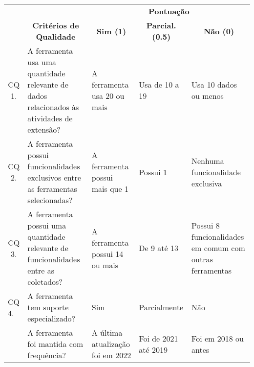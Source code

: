 \begin{table}[!htb]
  \centering
  \tiny
  \begin{tabular}{c|p{3.5cm}|p{1.5cm}|p{1.5cm}|p{2cm}}
    \bottomrule
    \rowcolor[rgb]{0.753,0.753,0.753} {\cellcolor[rgb]{0.753,0.753,0.753}}                              & \multicolumn{1}{c|}{{\cellcolor[rgb]{0.753,0.753,0.753}}}                                            & \multicolumn{3}{c}{\textbf{\textbf{Pontuação}}}                                                                                       \\
    \hhline{>{\arrayrulecolor[rgb]{0.753,0.753,0.753}}-->{\arrayrulecolor{black}}---}
    \rowcolor[rgb]{0.753,0.753,0.753} \multirow{-2}{*}{{\cellcolor[rgb]{0.753,0.753,0.753}}\textbf{ID}} & \multicolumn{1}{c|}{\multirow{-2}{*}{{\cellcolor[rgb]{0.753,0.753,0.753}}\textbf{Critérios de Qualidade}}} & \multicolumn{1}{c|}{\textbf{Sim (1)}}       & \multicolumn{1}{c|}{\textbf{Parcial. (0.5)}} & \multicolumn{1}{c}{\textbf{Não (0)}}   \\
    \hline
    \rowcolor[rgb]{0.898,0.898,0.898} CQ 1.                                                             & A ferramenta usa uma quantidade relevante de dados relacionados às atividades de extensão?                          & A ferramenta usa 20 ou mais                           & Usa de 10 a 19                                     & Usa 10 dados ou menos              \\
    CQ 2.                                                                                               & A ferramenta possui funcionalidades exclusivos entre as ferramentas selecionadas?                                         & A ferramenta possui mais que 1                              & Possui 1                                           & Nenhuma funcionalidade exclusiva                    \\
    \rowcolor[rgb]{0.898,0.898,0.898} CQ 3.                                                             & A ferramenta possui uma quantidade relevante de funcionalidades entre as coletados?                              & A ferramenta possui 14 ou mais                           & De 9 até 13                                        & Possui 8 funcionalidades em comum com outras ferramentas \\
    \multicolumn{1}{l|}{CQ 4.}                                                                          & A ferramenta tem suporte especializado?                                                              & Sim                                         & Parcialmente                                   & Não                                    \\
    \rowcolor[rgb]{0.898,0.898,0.898} \multicolumn{1}{l|}{CQ 5.}                                        & A ferramenta foi mantida com frequência?                                                             & A última atualização foi em 2022                 & Foi de 2021 até 2019                                   & Foi em 2018 ou antes                       \\
    \toprule
  \end{tabular}
\end{table}